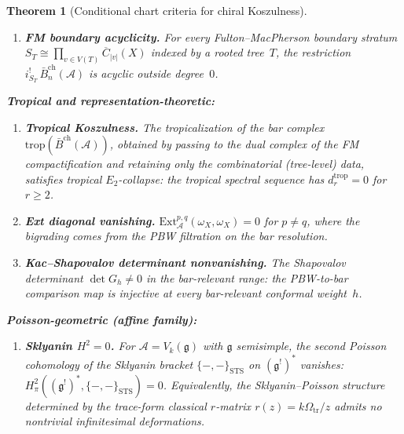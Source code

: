 \documentclass[11pt,reqno]{amsart}
\newtheorem{theorem}{Theorem}[section]
\theoremstyle{definition}
\theoremstyle{remark}
\newcommand{\cA}{\mathcal{A}}
\newcommand{\barBch}{\bar{B}^{\mathrm{ch}}}
\newcommand{\Ext}{\mathrm{Ext}}
\newcommand{\FM}{\overline{C}}
\newcommand{\fg}{\mathfrak{g}}
\newcommand{\Etwo}{E_2}
\numberwithin{equation}{section}
\begin{document}
\begin{theorem}[Conditional chart criteria for chiral Koszulness]
\begin{enumerate}[label=\textup{(\roman*)},leftmargin=2.4em]
\item\label{item:kfc-fm}
\textbf{FM boundary acyclicity.}
For every Fulton--MacPherson boundary stratum
$S_T \cong \prod_{v \in V(T)} \FM_{|v|}(X)$
indexed by a rooted tree~$T$, the restriction
$i_{S_T}^!\,\barBch_n(\cA)$ is acyclic outside degree~$0$.

\end{enumerate}

\medskip
\noindent
\textbf{Tropical and representation-theoretic:}
\begin{enumerate}[label=\textup{(\roman*)},leftmargin=2.4em,start=11]

\item\label{item:kfc-tropical}
\textbf{Tropical Koszulness.}
The tropicalization of the bar complex
$\mathrm{trop}(\barBch(\cA))$, obtained by
passing to the dual complex of the FM compactification and
retaining only the combinatorial (tree-level) data, satisfies
tropical $\Etwo$-collapse:
the tropical spectral sequence has $d_r^{\mathrm{trop}} = 0$
for $r \geq 2$.

\item\label{item:kfc-ext}
\textbf{Ext diagonal vanishing.}
$\Ext^{p,q}_\cA(\omega_X, \omega_X) = 0$ for $p \neq q$,
where the bigrading comes from the PBW filtration on the bar
resolution.

\item\label{item:kfc-ks}
\textbf{Kac--Shapovalov determinant nonvanishing.}
The Shapovalov determinant $\det G_h \neq 0$ in the bar-relevant
range: the PBW-to-bar comparison map is injective at every
bar-relevant conformal weight~$h$.

\end{enumerate}

\medskip
\noindent
\textbf{Poisson-geometric (affine family):}
\begin{enumerate}[label=\textup{(\roman*)},leftmargin=2.4em,start=14]

\item\label{item:kfc-sklyanin}
\textbf{Sklyanin $H^2 = 0$.}
For $\cA = V_k(\fg)$ with $\fg$ semisimple, the second Poisson
cohomology of the Sklyanin bracket
$\{-,-\}_{\mathrm{STS}}$ on $(\fg^!)^*$ vanishes:
$H^2_\pi((\fg^!)^*, \{-,-\}_{\mathrm{STS}}) = 0$.
Equivalently, the Sklyanin--Poisson structure determined by the
trace-form classical $r$-matrix
$r(z)=k\Omega_{\mathrm{tr}}/z$ admits no nontrivial infinitesimal
deformations.

\end{enumerate}


\end{theorem}
\end{document}
